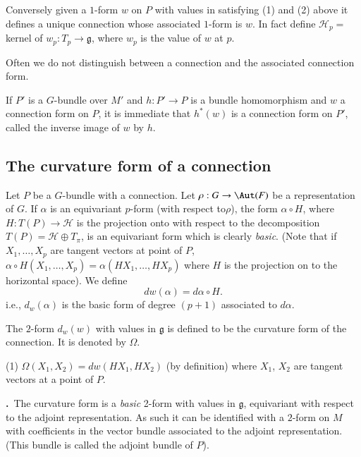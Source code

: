 Conversely given a $1$-form $w$ on $P$ with values in satisfying (1) and (2) above it defines a unique connection whose associated $1$-form is $w$. In fact define $\mathscr{H}_{p}=$ kernel of $w_{p}:T_{p}\to \mathfrak{g}$, where $w_{p}$ is the value of $w$ at $p$.

Often we do not distinguish between a connection and the associated connection form.

If $P'$ is a $G$-bundle over $M'$ and $h:P'\to P$ is a bundle homomorphism and $w$ a connection form on $P$, it is immediate that $h^{*}(w)$ is a connection form on $P'$, called the inverse image of $w$ by $h$.

\subsection*{The curvature form of a connection}

Let $P$ be a $G$-bundle with a connection. Let $\rho:G\to \Aut(F)$ be a representation of $G$. If $\alpha$ is an equivariant $p$-form (with respect to\pageoriginale $\rho$), the form $\alpha\circ H$, where $H:T(P)\to \mathscr{H}$ is the projection onto with respect to the decomposition $T(P)=\mathscr{H}\oplus T_{\pi}$, is an equivariant form which is clearly {\em basic}. (Note that if $X_{1},\ldots,X_{p}$ are tangent vectors at point of $P$, $\alpha\circ H(X_{1},\ldots,X_{p})=\alpha(HX_{1},\ldots,HX_{p})$ where $H$ is the projection on to the horizontal space). We define
$$
dw(\alpha)=d\alpha\circ H.
$$
i.e., $d_{w}(\alpha)$ is the basic form of degree $(p+1)$ associated to $d\alpha$.

\begin{defi*}
The $2$-form $d_{w}(w)$ with values in $\mathfrak{g}$ is defined to be the curvature form of the connection. It is denoted by $\Omega$.
\end{defi*}

\begin{remark}\label{sec12-rem12.1}
(1) $\Omega(X_{1},X_{2})=dw(HX_{1},HX_{2})$ (by definition) where $X_{1}$, $X_{2}$ are tangent vectors at a point of $P$.
\end{remark}

\noindent
{\bf {}.\label{sec12-ref12.2}}~The curvature form is a {\em basic} 2-form with values in $\mathfrak{g}$, equivariant with respect to the adjoint representation. As such it can be identified with a $2$-form on $M$ with coefficients in the vector bundle associated to the adjoint representation. (This bundle is called the adjoint bundle of $P$).

